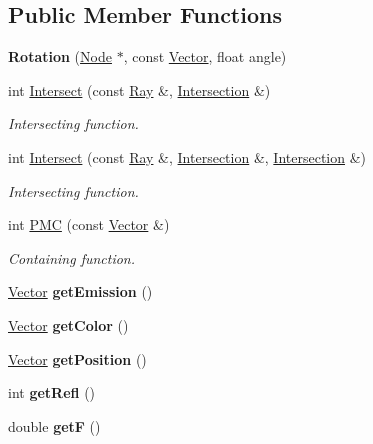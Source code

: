 \subsection*{\-Public \-Member \-Functions}
\begin{DoxyCompactItemize}
\item 
\hypertarget{class_rotation_a19ef7fb0baa64a4a518923f5c831fdd2}{
{\bfseries \-Rotation} (\hyperlink{class_node}{\-Node} $\ast$, const \hyperlink{class_vector}{\-Vector}, float angle)}
\label{class_rotation_a19ef7fb0baa64a4a518923f5c831fdd2}

\item 
int \hyperlink{class_rotation_a1209bbedf18d64a7fd7411235fb651bf}{\-Intersect} (const \hyperlink{class_ray}{\-Ray} \&, \hyperlink{class_intersection}{\-Intersection} \&)
\begin{DoxyCompactList}\small\item\em \-Intersecting function. \end{DoxyCompactList}\item 
int \hyperlink{class_rotation_a1b1ecff10f85a2f7ab778c06e9f6f263}{\-Intersect} (const \hyperlink{class_ray}{\-Ray} \&, \hyperlink{class_intersection}{\-Intersection} \&, \hyperlink{class_intersection}{\-Intersection} \&)
\begin{DoxyCompactList}\small\item\em \-Intersecting function. \end{DoxyCompactList}\item 
int \hyperlink{class_rotation_a1dbfa88ef89ea7bd50a875ca7fe9f911}{\-P\-M\-C} (const \hyperlink{class_vector}{\-Vector} \&)
\begin{DoxyCompactList}\small\item\em \-Containing function. \end{DoxyCompactList}\item 
\hypertarget{class_rotation_a16df69dc33ea554cfde8c8fa2d0174f2}{
\hyperlink{class_vector}{\-Vector} {\bfseries get\-Emission} ()}
\label{class_rotation_a16df69dc33ea554cfde8c8fa2d0174f2}

\item 
\hypertarget{class_rotation_a15418e82c782df1687eb2dd11cc469eb}{
\hyperlink{class_vector}{\-Vector} {\bfseries get\-Color} ()}
\label{class_rotation_a15418e82c782df1687eb2dd11cc469eb}

\item 
\hypertarget{class_rotation_a3dd8b11ab6ff47d626e49d766702210c}{
\hyperlink{class_vector}{\-Vector} {\bfseries get\-Position} ()}
\label{class_rotation_a3dd8b11ab6ff47d626e49d766702210c}

\item 
\hypertarget{class_rotation_acd09beb7679985b103b4e638deae0904}{
int {\bfseries get\-Refl} ()}
\label{class_rotation_acd09beb7679985b103b4e638deae0904}

\item 
\hypertarget{class_rotation_acea503033dd5293b86e3481682f6b29b}{
double {\bfseries get\-F} ()}
\label{class_rotation_acea503033dd5293b86e3481682f6b29b}

\end{DoxyCompactItemize}
